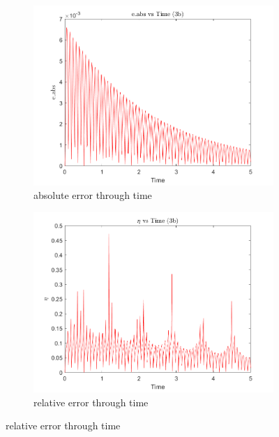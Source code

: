 \documentclass[a4paper,12pt]{article}
\begin{document}
\begin{figure}[h]
  \centering
  \begin{subfigure}[b]{0.5\textwidth}
      \includegraphics[width=\textwidth]{../../Matlab/task3b_plots/e_abs_vs_time.png}
      \caption{absolute error through time}
      \label{fig:image10}
  \end{subfigure}
  \hspace{-1.0em}%
  \begin{subfigure}[b]{0.5\textwidth}
      \includegraphics[width=\textwidth]{../../Matlab/task3b_plots/eta_vs_time.png}
      \caption{relative error through time}
      \label{fig:image11}
  \end{subfigure}


\end{figure}
\end{document}
